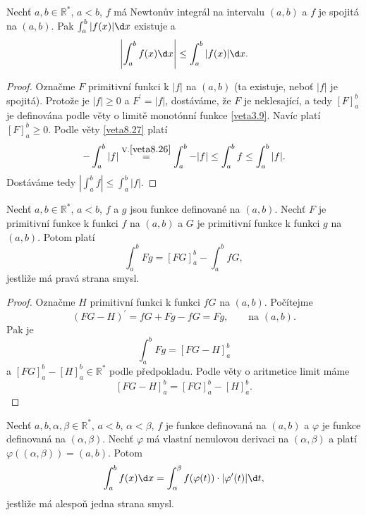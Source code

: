 \begin{veta}\label{veta8.29}
Nechť $a, b \in \mathbb{R}^*$, $a < b$,  $f$ má Newtonův integrál na intervalu $(a, b)$ a $f$ je spojitá na $(a, b)$. Pak
$\int_a^b |f(x)|\d x$ existuje a
\[
 \left|\int_a^b f(x)\d x\right| \leq \int_a^b |f(x)|\d x.
\]
\end{veta}

\begin{proof}
	Označme $F$ primitivní funkci k $|f|$ na $(a,b)$ (ta existuje, neboť $|f|$ je spojitá).
	Protože je $|f| \geq 0$ a $F^\prime = |f|$, dostáváme, že $F$ je neklesající, a tedy
	$[F]_a^b$ je definována podle věty o limitě monotónní funkce \ref{veta3.9}. Navíc platí
	$[F]_a^b \geq 0$. Podle věty \ref{veta8.27} platí
	$$
	    -\int_a^b |f|\stackrel{\text{V}.\ref{veta8.26}}{=}\int_a^b -|f| \leq \int_a^b f \leq \int_a^b |f|.
	$$
	Dostáváme tedy $|\int_a^b f|\leq \int_a^b |f|$.
\end{proof}

\begin{veta}\label{veta8.30}
Nechť $a, b \in \mathbb{R}^*$, $a < b$, $f$ a $g$ jsou funkce definované na $(a, b)$. Nechť $F$ je primitivní funkce k funkci $f$ na $(a, b)$ a $G$ je primitivní funkce k funkci $g$ na $(a, b)$. Potom platí
\[
\int_a^b Fg = [FG]_a^b - \int_a^b fG,
\]
jestliže má pravá strana smysl.
\end{veta}

\begin{proof}
	Označme $H$ primitivní funkci k funkci $fG$ na $(a,b)$. Počítejme
	$$
	(FG-H)^\prime = fG+Fg-fG=Fg, \qquad \text{na } (a,b).
	$$
	Pak je
	$$
	    \int_a^b Fg= [FG-H]_a^b
	$$
	a $[FG]_a^b - [H]_a^b \in \mathbb R ^*$ podle předpokladu. Podle věty o aritmetice limit
	máme
	$$
	    [FG-H]_a^b = [FG]_a^b - [H]_a^b.
	$$
\end{proof}

\begin{veta}\label{veta8.31}
Nechť $a, b, \alpha, \beta \in \mathbb{R}^*$, $a < b$, $\alpha < \beta$, $f$ je funkce definovaná na $(a, b)$ a $\varphi$ je funkce definovaná na $(\alpha, \beta)$. Nechť $\varphi$ má vlastní nenulovou derivaci na $(\alpha, \beta)$ a platí $\varphi((\alpha, \beta)) = (a, b)$. Potom
\[
\int_a^b f(x)\d x = \int_\alpha^\beta f(\varphi(t))\cdot |\varphi^\prime(t)|\d t,
\]
jestliže má alespoň jedna strana smysl.
\end{veta}

